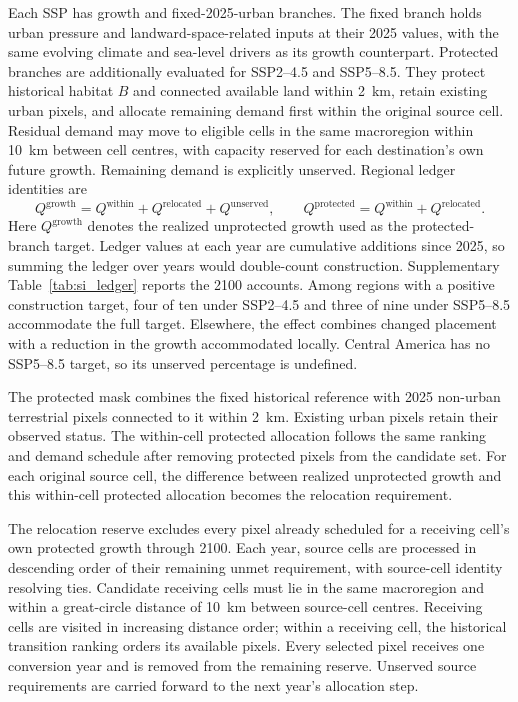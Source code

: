 Each SSP has growth and fixed-2025-urban branches. The fixed branch holds urban pressure and landward-space-related inputs at their 2025 values, with the same evolving climate and sea-level drivers as its growth counterpart. Protected branches are additionally evaluated for SSP2--4.5 and SSP5--8.5. They protect historical habitat $B$ and connected available land within 2~km, retain existing urban pixels, and allocate remaining demand first within the original source cell. Residual demand may move to eligible cells in the same macroregion within 10~km between cell centres, with capacity reserved for each destination's own future growth. Remaining demand is explicitly unserved. Regional ledger identities are
\begin{equation}\label{eq:si_protection_ledger}
Q^{\mathrm{growth}}=Q^{\mathrm{within}}+Q^{\mathrm{relocated}}+Q^{\mathrm{unserved}},\qquad
Q^{\mathrm{protected}}=Q^{\mathrm{within}}+Q^{\mathrm{relocated}}.
\end{equation}
Here $Q^{\mathrm{growth}}$ denotes the realized unprotected growth used as the protected-branch target. Ledger values at each year are cumulative additions since 2025, so summing the ledger over years would double-count construction. Supplementary Table~\ref{tab:si_ledger} reports the 2100 accounts. Among regions with a positive construction target, four of ten under SSP2--4.5 and three of nine under SSP5--8.5 accommodate the full target. Elsewhere, the effect combines changed placement with a reduction in the growth accommodated locally. Central America has no SSP5--8.5 target, so its unserved percentage is undefined.


The protected mask combines the fixed historical reference with 2025 non-urban terrestrial pixels connected to it within 2~km. Existing urban pixels retain their observed status. The within-cell protected allocation follows the same ranking and demand schedule after removing protected pixels from the candidate set. For each original source cell, the difference between realized unprotected growth and this within-cell protected allocation becomes the relocation requirement.

The relocation reserve excludes every pixel already scheduled for a receiving cell's own protected growth through 2100. Each year, source cells are processed in descending order of their remaining unmet requirement, with source-cell identity resolving ties. Candidate receiving cells must lie in the same macroregion and within a great-circle distance of 10~km between source-cell centres. Receiving cells are visited in increasing distance order; within a receiving cell, the historical transition ranking orders its available pixels. Every selected pixel receives one conversion year and is removed from the remaining reserve. Unserved source requirements are carried forward to the next year's allocation step.

